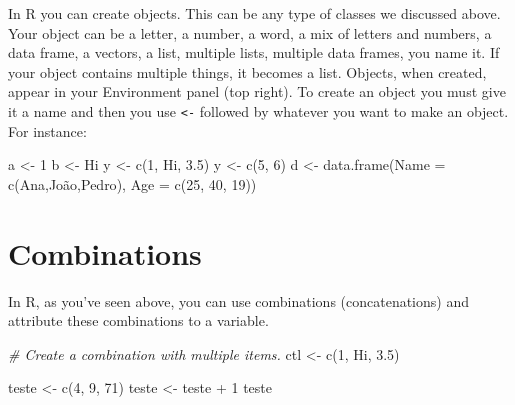 \documentclass[
]{book}
\newenvironment{Shaded}{\begin{snugshade}}{\end{snugshade}}
\newcommand{\CommentTok}[1]{\textcolor[rgb]{0.56,0.35,0.01}{\textit{#1}}}
\newcommand{\DecValTok}[1]{\textcolor[rgb]{0.00,0.00,0.81}{#1}}
\newcommand{\FloatTok}[1]{\textcolor[rgb]{0.00,0.00,0.81}{#1}}
\newcommand{\FunctionTok}[1]{\textcolor[rgb]{0.00,0.00,0.00}{#1}}
\newcommand{\NormalTok}[1]{#1}
\newcommand{\OtherTok}[1]{\textcolor[rgb]{0.56,0.35,0.01}{#1}}
\newcommand{\SpecialCharTok}[1]{\textcolor[rgb]{0.00,0.00,0.00}{#1}}
\newcommand{\StringTok}[1]{\textcolor[rgb]{0.31,0.60,0.02}{#1}}
\begin{document}
In R you can create objects.
This can be any type of classes we discussed above.
Your object can be a letter, a number, a word, a mix of letters and numbers, a data frame, a vectors, a list, multiple lists, multiple data frames, you name it.
If your object contains multiple things, it becomes a list.
Objects, when created, appear in your Environment panel (top right).
To create an object you must give it a name and then you use \texttt{\textless{}-} followed by whatever you want to make an object.\\

For instance:

\begin{Shaded}
\begin{Highlighting}[]
\NormalTok{a }\OtherTok{\textless{}{-}} \DecValTok{1}
\NormalTok{b }\OtherTok{\textless{}{-}} \StringTok{\textquotesingle{}Hi\textquotesingle{}}
\NormalTok{y }\OtherTok{\textless{}{-}} \FunctionTok{c}\NormalTok{(}\DecValTok{1}\NormalTok{, }\StringTok{\textquotesingle{}Hi\textquotesingle{}}\NormalTok{, }\FloatTok{3.5}\NormalTok{)}
\NormalTok{y }\OtherTok{\textless{}{-}} \FunctionTok{c}\NormalTok{(}\DecValTok{5}\NormalTok{, }\DecValTok{6}\NormalTok{)}
\NormalTok{d }\OtherTok{\textless{}{-}} \FunctionTok{data.frame}\NormalTok{(}\StringTok{\textquotesingle{}Name\textquotesingle{}} \OtherTok{=} \FunctionTok{c}\NormalTok{(}\StringTok{\textquotesingle{}Ana\textquotesingle{}}\NormalTok{,}\StringTok{\textquotesingle{}João\textquotesingle{}}\NormalTok{,}\StringTok{\textquotesingle{}Pedro\textquotesingle{}}\NormalTok{), }\StringTok{\textquotesingle{}Age\textquotesingle{}} \OtherTok{=} \FunctionTok{c}\NormalTok{(}\DecValTok{25}\NormalTok{, }\DecValTok{40}\NormalTok{, }\DecValTok{19}\NormalTok{))}
\end{Highlighting}
\end{Shaded}

\hypertarget{combinations}{%
\section{Combinations}\label{combinations}}

In R, as you've seen above, you can use combinations (concatenations) and attribute these combinations to a variable.

\begin{Shaded}
\begin{Highlighting}[]
\CommentTok{\# Create a combination with multiple items.}
\NormalTok{ctl }\OtherTok{\textless{}{-}} \FunctionTok{c}\NormalTok{(}\DecValTok{1}\NormalTok{, }\StringTok{\textquotesingle{}Hi\textquotesingle{}}\NormalTok{, }\FloatTok{3.5}\NormalTok{)}

\NormalTok{teste }\OtherTok{\textless{}{-}} \FunctionTok{c}\NormalTok{(}\DecValTok{4}\NormalTok{, }\DecValTok{9}\NormalTok{, }\DecValTok{71}\NormalTok{)}
\NormalTok{teste }\OtherTok{\textless{}{-}}\NormalTok{ teste }\SpecialCharTok{+} \DecValTok{1}
\NormalTok{teste}
\end{Highlighting}
\end{Shaded}
\end{document}
